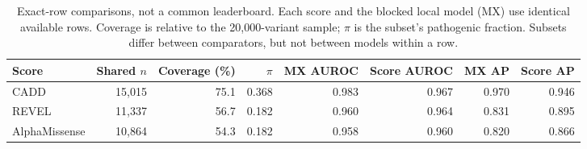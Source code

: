\begin{table}[t]
\caption{Exact-row comparisons, not a common leaderboard. Each score and the blocked local model (MX) use identical available rows. Coverage is relative to the 20,000-variant sample; $\pi$ is the subset's pathogenic fraction. Subsets differ between comparators, but not between models within a row.}
\label{tab:comparators}
\centering\footnotesize
\setlength{\tabcolsep}{6.2pt}
\begin{tabular}{@{}lrrrrrrr@{}}
\toprule
Score & Shared $n$ & Coverage (\%) & $\pi$ & MX AUROC & Score AUROC & MX AP & Score AP \\
\midrule
CADD & 15,015 & 75.1 & 0.368 & 0.983 & 0.967 & 0.970 & 0.946 \\
REVEL & 11,337 & 56.7 & 0.182 & 0.960 & 0.964 & 0.831 & 0.895 \\
AlphaMissense & 10,864 & 54.3 & 0.182 & 0.958 & 0.960 & 0.820 & 0.866 \\
\bottomrule
\end{tabular}
\end{table}
